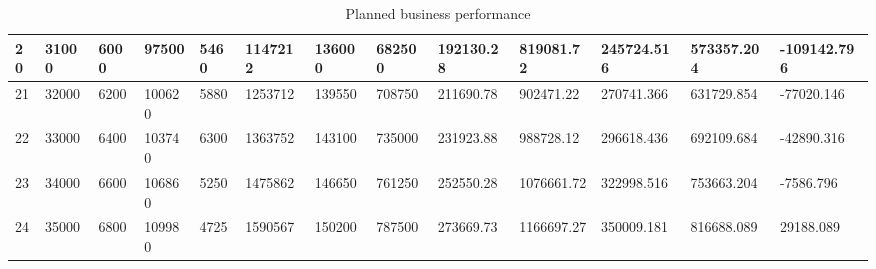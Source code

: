 \begin{table}[]
{\begin{tabular}{|l|l|l|l|l|l|l|l|l|l|l|l|l|}
    20    & 31000     & 6000          & 97500                                                 & 5460                                                           & 1147212                                                  & 136000                                                     & 682500                                                          & 192130.28 & 819081.72  & 245724.516    & 573357.204       & -109142.796     \\ \hline
    21    & 32000     & 6200          & 100620                                                & 5880                                                           & 1253712                                                  & 139550                                                     & 708750                                                          & 211690.78 & 902471.22  & 270741.366    & 631729.854       & -77020.146      \\ \hline
    22    & 33000     & 6400          & 103740                                                & 6300                                                           & 1363752                                                  & 143100                                                     & 735000                                                          & 231923.88 & 988728.12  & 296618.436    & 692109.684       & -42890.316      \\ \hline
    23    & 34000     & 6600          & 106860                                                & 5250                                                           & 1475862                                                  & 146650                                                     & 761250                                                          & 252550.28 & 1076661.72 & 322998.516    & 753663.204       & -7586.796       \\ \hline
    24    & 35000     & 6800          & 109980                                                & 4725                                                           & 1590567                                                  & 150200                                                     & 787500                                                          & 273669.73 & 1166697.27 & 350009.181    & 816688.089       & 29188.089       \\ \hline
\end{tabular}}
\caption{Planned business performance}
\label{fig:budget}
\end{table}

